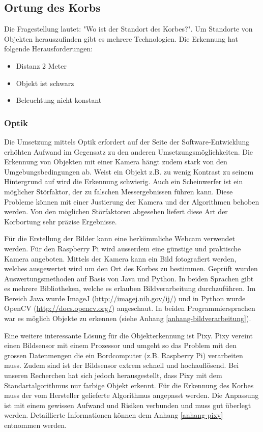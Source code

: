 \subsection{Ortung des Korbs}
Die Fragestellung lautet: "Wo ist der Standort des Korbes?". Um Standorte von Objekten herauszufinden gibt es mehrere Technologien. Die Erkennung hat folgende Herausforderungen:
\begin{itemize}
	\item Distanz 2 Meter
	\item Objekt ist schwarz
	\item Beleuchtung nicht konstant
\end{itemize}

\subsubsection{Optik}
Die Umsetzung mittels Optik erfordert auf der Seite der Software-Entwicklung erhöhten Aufwand im Gegensatz zu den anderen Umsetzungsmöglichkeiten. Die Erkennung von Objekten mit einer Kamera hängt zudem stark von den Umgebungsbedingungen ab. Weist ein Objekt z.B. zu wenig Kontrast zu seinem Hintergrund auf wird die Erkennung schwierig. Auch ein Scheinwerfer ist ein möglicher Störfaktor, der zu falschen Messergebnissen führen kann. Diese Probleme können mit einer Justierung der Kamera und der Algorithmen behoben werden. Von den möglichen Störfaktoren abgesehen liefert diese Art der Korbortung sehr präzise Ergebnisse.

Für die Erstellung der Bilder kann eine herkömmliche Webcam verwendet werden. Für den Raspberry Pi wird ausserdem eine günstige und praktische Kamera angeboten. Mittels der Kamera kann ein Bild fotografiert werden, welches ausgewertet wird um den Ort des Korbes zu bestimmen. Geprüft wurden Auswertungsmethoden auf Basis von Java und Python. In beiden Sprachen gibt es mehrere Bibliotheken, welche es erlauben Bildverarbeitung durchzuführen. Im Bereich Java wurde ImageJ (\href{http://imagej.nih.gov/ij/}{http://imagej.nih.gov/ij/}) und in Python wurde OpenCV (\href{http://docs.opencv.org/}{http://docs.opencv.org/}) angeschaut. In beiden Programmiersprachen war es möglich Objekte zu erkennen (siehe Anhang \ref{anhang-bildverarbeitung}).

Eine weitere interessante Lösung für die Objekterkennung ist Pixy. Pixy vereint einen Bildsensor mit einem Prozessor und umgeht so das Problem mit den grossen Datenmengen die ein Bordcomputer (z.B. Raspberry Pi) verarbeiten muss. Zudem sind ist der Bildsensor extrem schnell und hochauflösend. Bei unseren Recherchen hat sich jedoch herausgestellt, dass Pixy mit dem Standartalgorithmus nur farbige Objekt erkennt. Für die Erkennung des Korbes muss der vom Hersteller gelieferte Algorithmus angepasst werden. Die Anpassung ist mit einem gewissen Aufwand und Risiken verbunden und muss gut überlegt werden. Detaillierte Informationen können dem Anhang \ref{anhang-pixy} entnommen werden.

